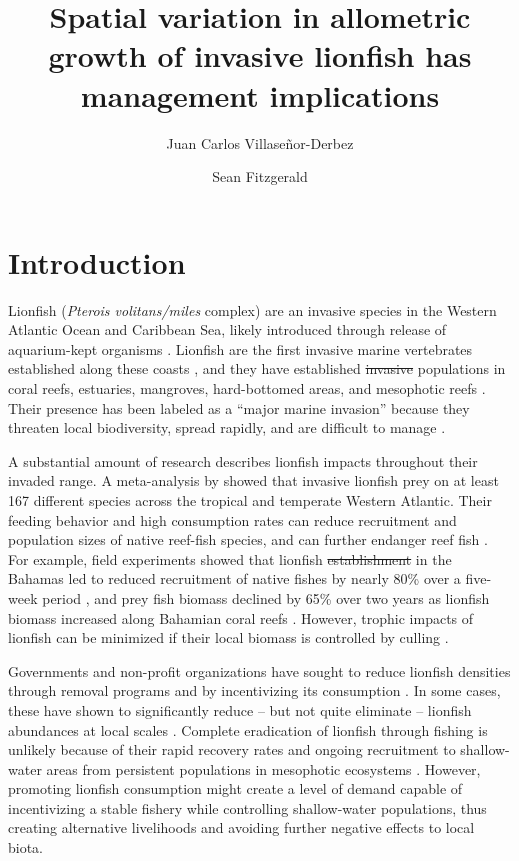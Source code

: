 \documentclass[fleqn,10pt,lineno]{wlpeerj} %
\title{Spatial variation in allometric growth of invasive lionfish has
management implications}
\author[1]{Juan Carlos Villaseñor-Derbez}
\author[1]{Sean Fitzgerald}
\affil[1]{Bren School of Environmental Science and Management, University of California, Santa Barbara, Santa Barbara, CA, United States} %
\providecommand{\DIFdel}[1]{{\protect\color{red}\sout{#1}}}                      %
\providecommand{\DIFdelbegin}{} %
\providecommand{\DIFdelend}{} %
\begin{document}
\flushbottom
\maketitle
\thispagestyle{empty}

\section*{Introduction}

Lionfish (\emph{Pterois volitans/miles} complex) are an invasive species
in the Western Atlantic Ocean and Caribbean Sea, likely introduced
through release of aquarium-kept organisms \citep{betancurr_2011}.
Lionfish are the first invasive marine vertebrates established along
these coasts \citep{schofield_2009,schofield_2010,sabidoitza_2016}, and
they have established \DIFdelbegin \DIFdel{invasive }\DIFdelend populations in coral reefs, estuaries,
mangroves, hard-bottomed areas, and mesophotic reefs
\citep{barbour_2010,jud_2011,muoz_2011,claydon_2012,andradibrown_2017,gress_2017}.
Their presence has been labeled as a ``major marine invasion'' because
they threaten local biodiversity, spread rapidly, and are difficult to
manage \citep{hixon_2016}.

A substantial amount of research describes lionfish impacts throughout
their invaded range. A meta-analysis by \citet{peake_2018} showed that
invasive lionfish prey on at least 167 different species across the
tropical and temperate Western Atlantic. Their feeding behavior and high
consumption rates can reduce recruitment and population sizes of native
reef-fish species, and can further endanger reef fish
\citep[][but see \citealt{hackerott_2017} for a counterexample]{green_2012,rocha_2015}.
For example, field experiments showed that lionfish \DIFdelbegin \DIFdel{establishment }\DIFdelend in the
Bahamas led to reduced recruitment of native fishes by nearly 80\% over
a five-week period \citep{albins_2008}, and prey fish biomass declined
by 65\% over two years as lionfish biomass increased along Bahamian
coral reefs \citep{green_2012}. However, trophic impacts of lionfish can
be minimized if their local biomass is controlled by culling
\citep{ariasgonzalez_2011}.

Governments and non-profit organizations have sought to reduce lionfish
densities through removal programs and by incentivizing its consumption
\citep{chin_2016}. In some cases, these have shown to significantly
reduce -- but not quite eliminate -- lionfish abundances at local scales
\citep{deleon_2013,sandel_2015}. Complete eradication of lionfish
through fishing is unlikely because of their rapid recovery rates and
ongoing recruitment to shallow-water areas from persistent populations
in mesophotic ecosystems \citep{barbour_2011,andradibrown_2017}.
However, promoting lionfish consumption might create a level of demand
capable of incentivizing a stable fishery while controlling
shallow-water populations, thus creating alternative livelihoods and
avoiding further negative effects to local biota.
\end{document}
